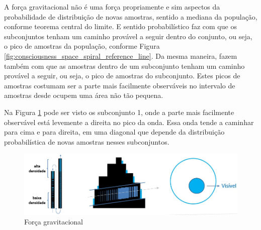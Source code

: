 A força gravitacional não é uma força propriamente e sim aspectos da probabilidade de distribuição de novas amostras, sentido a mediana da população, conforme teorema central do limite. E sentido probabilístico faz com que os subconjuntos tenham um caminho provável a seguir dentro do conjunto, ou seja, o pico de amostras da população, conforme Figura \ref{fig:consciousness_space_spiral_reference_line}. Da mesma maneira, fazem também com que as amostras dentro de um subconjunto tenham um caminho provável a seguir, ou seja, o pico de amostras do subconjunto. Estes picos de amostras costumam ser a parte mais facilmente observáveis no intervalo de amostras desde ocupem uma área não tão pequena. 

Na Figura \ref{fig:consciousness_gravitational_force} pode ser visto os subconjunto 1, onde a parte mais facilmente observável está levemente a direita no pico da onda. Essa onda tende a caminhar para cima e para direita, em uma diagonal que depende da distribuição probabilística de novas amostras nesses subconjuntos.
	\begin{figure}[H]
	\caption{Força gravitacional}
	\label{fig:consciousness_gravitational_force}
	\centering
	\includegraphics[scale=.6]{sections/images/consciousness_gravitational_force.jpg}
	\end{figure}

